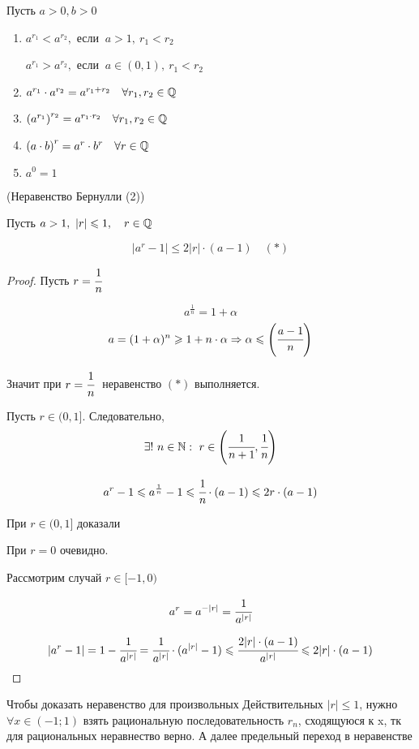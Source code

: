     Пусть $a > 0, b > 0$
    \begin{enumerate}
        \item $a^{r_{1}} < a^{r_{2}},$ если $\ a > 1, \ r_{1} < r_{2}$
        
        $a^{r_{1}} > a^{r_{2}},$ если $\ a \in (0, 1), \ r_{1} < r_{2}$
        \item $a^{r_1} \cdot a^{r_{2}} = a^{r_{1} + r_{2}} \quad \forall r_{1}, r_{2} \in \Q$ 
        \item $\left(a^{r_{1}}\right)^{r_{2}} = a^{r_{1} \cdot r_{2}} \quad \forall r_{1}, r_{2} \in \Q$
        \item $\left(a \cdot b\right)^{r} = a^{r} \cdot b^{r} \quad \forall r \in \Q$
        \item $a^{0} = 1$
    \end{enumerate}
\begin{lemma}
    \hypertarget{lem4.14}{(Неравенство Бернулли (2))}
    
    Пусть $a > 1,\ |r| \leq 1, \quad r \in \Q$

    $$
    |a^{r} - 1| \leq 2|r| \cdot(a-1) \quad (*)
    $$
\end{lemma}
\begin{proof}
    Пусть $r = \cfrac{1}{n}$

    $$
    a^{\frac{1}{n}} = 1 + \alpha
    $$
    $$
    a= (1 + \alpha)^{n} \geq 1 + n\cdot \alpha \Rightarrow \alpha \leq \left(\cfrac{a-1}{n}\right)
    $$

    Значит при $r = \cfrac{1}{n} \ $ неравенство $(*)$ выполняется.

    Пусть $r \in (0,1]$. Следовательно,
    $$
    \exists ! \ n \in \N: \ r \in \left(\cfrac{1}{n+1}, \cfrac{1}{n}\right)
    $$

    $$
    a^{r} - 1 \leq a^{\frac{1}{n}} - 1 \leq \cfrac{1}{n} \cdot(a-1) \leq 2r \cdot(a-1)
    $$
    
    При $r \in (0,1]$ доказали

    При $r = 0$ очевидно.

    Рассмотрим случай $r \in [-1, 0)$

    $$
    a^{r} = a^{-|r|} = \cfrac{1}{a^{|r|}}
    $$
    
    $$
    |a^{r}-1| = 1-\cfrac{1}{a^{|r|}} = \cfrac{1}{a^{|r|}}\cdot (a^{|r|} - 1) \leq \cfrac{2|r| \cdot (a-1)}{a^{|r|}} \leq 2|r| \cdot(a-1)
    $$
\end{proof}

    Чтобы доказать неравенство для произвольных Действительных $|r| \leq 1$, нужно $\forall x \in (-1; 1)$ взять рациональную последовательность ${r_n}$, сходящуюся к x, тк для рациональных неравнество верно. А далее предельный переход в неравенстве

